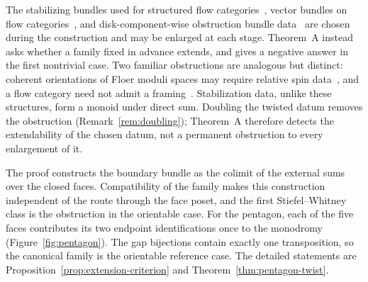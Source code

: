 \documentclass[11pt,letterpaper,twoside]{article}
\theoremstyle{plain}
\theoremstyle{definition}
\theoremstyle{remark}
\let\cite\citep
\begin{document}
The stabilizing bundles used for structured flow categories~\cite[Defs.~2.35, 3.8]{abouzaidblumberg2024}, vector bundles on flow categories~\cite[Def.~2.32]{blakeyporcelli2026}, and disk-component-wise obstruction bundle data~\cite[Def.~5.1, Thm.~5.4]{fooo2020} are chosen during the construction and may be enlarged at each stage.  Theorem~A instead asks whether a family fixed in advance extends, and gives a negative answer in the first nontrivial case.  Two familiar obstructions are analogous but distinct: coherent orientations of Floer moduli spaces may require relative spin data~\cite{fooo2009,ekholmetnyresullivan2005}, and a flow category need not admit a framing~\cite{cohenjonessegal1995,cohen2020floer}.  Stabilization data, unlike these structures, form a monoid under direct sum.  Doubling the twisted datum removes the obstruction (Remark~\ref{rem:doubling}); Theorem~A therefore detects the extendability of the chosen datum, not a permanent obstruction to every enlargement of it.

The proof constructs the boundary bundle as the colimit of the external sums over the closed faces.  Compatibility of the family makes this construction independent of the route through the face poset, and the first Stiefel--Whitney class is the obstruction in the orientable case.  For the pentagon, each of the five faces contributes its two endpoint identifications once to the monodromy (Figure~\ref{fig:pentagon}).  The gap bijections contain exactly one transposition, so the canonical family is the orientable reference case.  The detailed statements are Proposition~\ref{prop:extension-criterion} and Theorem~\ref{thm:pentagon-twist}.
\end{document}
